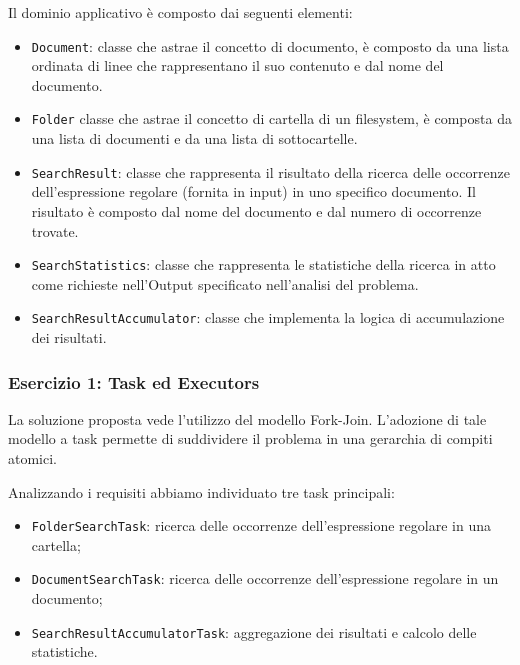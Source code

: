 ﻿\documentclass[a4paper]{article}
\begin{document}
Il dominio applicativo \`e composto dai seguenti elementi:

\begin{itemize}
%
    \item \texttt{Document}: classe che astrae il concetto di documento, \`e composto da una lista ordinata di linee che rappresentano il suo contenuto e dal nome del documento.
%
    \item \texttt{Folder} classe che astrae il concetto di cartella di un filesystem, \`e composta da una lista di documenti e da una lista di sottocartelle.
%
    \item \texttt{SearchResult}: classe che rappresenta il risultato della ricerca delle occorrenze dell'espressione regolare (fornita in input) in uno specifico documento.
%
    Il risultato \`e composto dal nome del documento e dal numero di occorrenze trovate.
%
    \item \texttt{SearchStatistics}: classe che rappresenta le statistiche della ricerca in atto come richieste nell'Output specificato nell'analisi del problema.
%
    \item \texttt{SearchResultAccumulator}: classe che implementa la logica di accumulazione dei risultati.
%
\end{itemize}

\subsubsection{Esercizio 1: Task ed Executors}

La soluzione proposta vede l'utilizzo del modello Fork-Join.
%
L'adozione di tale modello a task permette di suddividere il problema in una gerarchia di compiti atomici.

Analizzando i requisiti abbiamo individuato tre task principali:

\begin{itemize}
%
    \item \texttt{FolderSearchTask}: ricerca delle occorrenze dell'espressione regolare in una cartella;
%
    \item \texttt{DocumentSearchTask}: ricerca delle occorrenze dell'espressione regolare in un documento;
%
    \item \texttt{SearchResultAccumulatorTask}: aggregazione dei risultati e calcolo delle statistiche.
%
\end{itemize}
\end{document}
